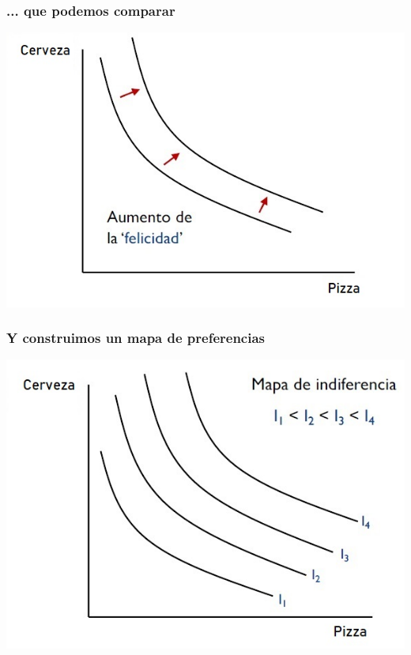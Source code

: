 \documentclass{beamer}
\begin{document}
\begin{frame}
\frametitle{... que podemos comparar}
\centering
\includegraphics[scale=0.6]{../Figures/Tema_02.15_rp13.jpg}
\end{frame}

\begin{frame}
\frametitle{Y construimos un mapa de preferencias}
\centering
\includegraphics[scale=0.6]{../Figures/Tema_02.16_rp14.jpg}
\end{frame}
\end{document}

